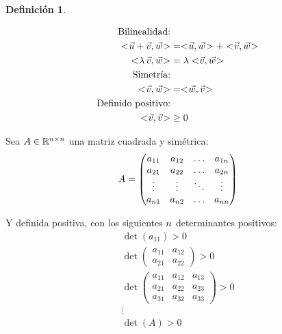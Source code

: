 \documentclass[a5paper,12pt,twoside]{book}
\newtheorem{defn}{{Definición}}[chapter]
\begin{document}
\begin{mdframed}[style=DefinitionFrame]
    \begin{defn}
        \label{defn:intProd}
    \end{defn}
    \begin{align*}
        \textrm{Bilinealidad:} &
        \\
        \intProd{\Vec{u}+\Vec{v}}{\Vec{w}} &= \intProd{\Vec{u}}{\Vec{w}} + \intProd{\Vec{v}}{\Vec{w}}
        \\
        \intProd{\lambda \, \Vec{v}}{\Vec{w}} &= \lambda \intProd{\Vec{v}}{\Vec{w}}
        \\
        \textrm{Simetría:} &
        \\
        \intProd{\Vec{v}}{\Vec{w}} &= \intProd{\Vec{w}}{\Vec{v}}
        \\
        \textrm{Definido positivo:} &
        \\
        \intProd{\Vec{v}}{\Vec{v}} &\geq 0
    \end{align*}
\end{mdframed}

Sea $A\in\mathbb{R}^{n\times n}$ una matriz cuadrada y simétrica:
\begin{equation*}
    A =
    \begin{pmatrix}
        a_{11} & a_{12} & \dots & a_{1n}
        \\
        a_{21} & a_{22} & \dots & a_{2n}
        \\
        \vdots & \vdots & \ddots & \vdots
        \\
        a_{n 1} & a_{n 2} & \dots & a_{n n}
    \end{pmatrix}
\end{equation*}

Y definida positiva, con los siguientes $n$ determinantes positivos:
\begin{gather*}
    \operatorname{det}(a_{11})>0
    \\
    \operatorname{det}
    \begin{pmatrix}
        a_{11} & a_{12}
        \\
        a_{21} & a_{22}
    \end{pmatrix}
    >0
    \\
    \operatorname{det}
    \begin{pmatrix}
        a_{11} & a_{12} & a_{13}
        \\
        a_{21} & a_{22} & a_{23}
        \\
        a_{31} & a_{32} & a_{33}
    \end{pmatrix}
    >0
    \\
    \vdots
    \\
    \operatorname{det}(A)>0
\end{gather*}
\end{document}
